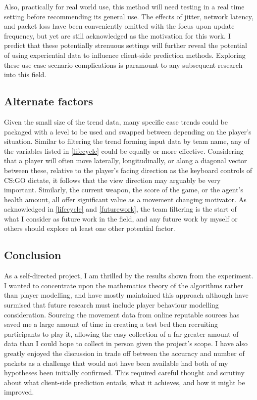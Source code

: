 \documentclass[journal]{IEEEtran}
\begin{document}
Also, practically for real world use, this method will need testing in a real time setting before recommending its general use. The effects of jitter, network latency, and packet loss have been conveniently omitted with the focus upon update frequency, but yet are still acknowledged as the motivation for this work. I predict that these potentially strenuous settings will further reveal the potential of using experiential data to influence client-side prediction methods. Exploring these use case scenario complications is paramount to any subsequent research into this field.

\subsection{Alternate factors} \label{app:factors}

Given the small size of the trend data, many specific case trends could be packaged with a level to be used and swapped between depending on the player's situation. Similar to filtering the trend forming input data by team name, any of the variables listed in \ref{lifecycle} could be equally or more effective. Considering that a player will often move laterally, longitudinally, or along a diagonal vector between these, relative to the player's facing direction as the keyboard controls of CS:GO dictate, it follows that the view direction may arguably be very important. Similarly, the current weapon, the score of the game, or the agent's health amount, all offer significant value as a movement changing motivator. As acknowledged in \ref{lifecycle} and \ref{futurework}, the team filtering is the start of what I consider as future work in the field, and any future work by myself or others should explore at least one other potential factor.

\subsection{Conclusion}

As a self-directed project, I am thrilled by the results shown from the experiment. I wanted to concentrate upon the mathematics theory of the algorithms rather than player modelling, and have mostly maintained this approach although have surmised that future research must include player behaviour modelling consideration. Sourcing the movement data from online reputable sources has saved me a large amount of time in creating a test bed then recruiting participants to play it, allowing the easy collection of a far greater amount of data than I could hope to collect in person given the project's scope. I have also greatly enjoyed the discussion in trade off between the accuracy and number of packets as a challenge that would not have been available had both of my hypotheses been initially confirmed. This required careful thought and scrutiny about what client-side prediction entails, what it achieves, and how it might be improved. \\ \\
\end{document}
